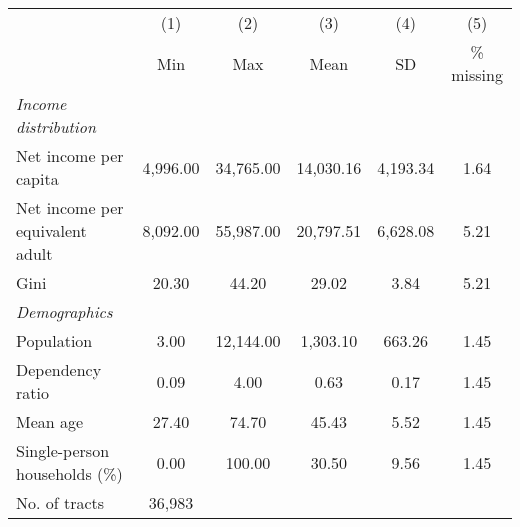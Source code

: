 
\begin{tabular}{@{}lccccc@{}}
\toprule
  & (1) & (2) & (3) &  (4) &  (5) \\
 & Min & Max & Mean & SD & \% missing\\
\midrule
\qquad \textit{Income distribution} \\
Net income per capita &  4,996.00 & 34,765.00 & 14,030.16 &  4,193.34 &      1.64\\
Net income per equivalent adult &  8,092.00 & 55,987.00 & 20,797.51 &  6,628.08 &      5.21\\
Gini &     20.30 &     44.20 &     29.02 &      3.84 &      5.21\\
\qquad \textit{Demographics} \\
Population &      3.00 & 12,144.00 &  1,303.10 &    663.26 &      1.45\\
Dependency ratio &      0.09 &      4.00 &      0.63 &      0.17 &      1.45\\
Mean age &     27.40 &     74.70 &     45.43 &      5.52 &      1.45\\
Single-person households (\%) &      0.00 &    100.00 &     30.50 &      9.56 &      1.45\\
\midrule
No. of tracts &          36,983 \\
\midrule
\end{tabular}